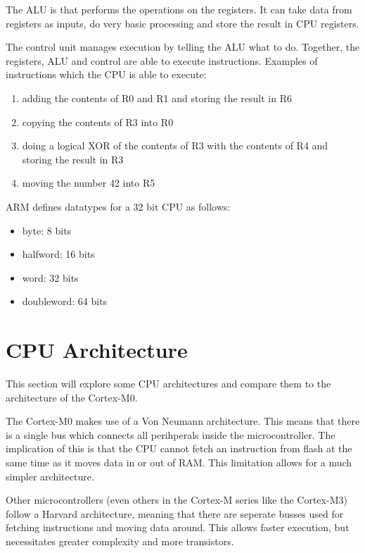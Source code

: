 The ALU is that performs the operations on the registers. It can take data from registers as inputs, do very basic processing and store the result in CPU registers. 

The control unit manages execution by telling the ALU what to do. Together, the registers, ALU and control are able to execute instructions. 
Examples of instructions which the CPU is able to execute:
\begin{enumerate}
  \item adding the contents of R0 and R1 and storing the result in R6
  \item copying the contents of R3 into R0
  \item doing a logical XOR of the contents of R3 with the contents of R4 and storing the result in R3
  \item moving the number 42 into R5
\end{enumerate}

ARM defines datatypes for a 32 bit CPU as follows:
\begin{itemize}
  \item byte: 8 bits
  \item halfword: 16 bits
  \item word: 32 bits
  \item doubleword: 64 bits
\end{itemize}

\section{CPU Architecture}
This section will explore some CPU architectures and compare them to the architecture of the Cortex-M0.

The Cortex-M0 makes use of a Von Neumann architecture. This means that there is a single bus which connects all perihperals inside the microcontroller. The implication of this is that the CPU cannot fetch an instruction from flash at the same time as it moves data in or out of RAM. This limitation allows for a much simpler architecture.

Other microcontrollers (even others in the Cortex-M series like the Cortex-M3) follow a Harvard architecture, meaning that there are seperate busses used for fetching instructions and moving data around. This allows faster execution, but necessitates greater complexity and more transistors. 

